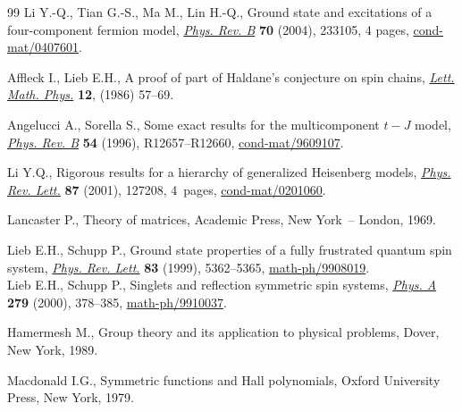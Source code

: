 \documentclass[11pt]{article}
\begin{document}
\begin{thebibliography}{99}
Li Y.-Q., Tian G.-S., Ma M., Lin H.-Q.,
Ground state and excitations of a four-component fermion model,
\href{http://dx.doi.org/10.1103/PhysRevB.70.233105}{{\it Phys. Rev. B}} {\bf 70} (2004), 233105, 4 pages,
\href{http://arxiv.org/abs/cond-mat/0407601}{cond-mat/0407601}.


Af\/f\/leck I., Lieb E.H.,
A proof of part of Haldane's conjecture on spin chains,
\href{http://dx.doi.org/10.1007/BF00400304}{{\it Lett. Math. Phys.}} {\bf 12}, (1986) 57--69.

Angelucci A., Sorella S.,
Some exact results for the multicomponent $t-J$ model,
\href{http://dx.doi.org/10.1103/PhysRevB.54.R12657}{{\it Phys. Rev. B}} {\bf 54}  (1996), R12657--R12660,
\href{http://arxiv.org/abs/cond-mat/9609107}{cond-mat/9609107}.


Li Y.Q.,
Rigorous results for a hierarchy of generalized Heisenberg models,
\href{http://dx.doi.org/10.1103/PhysRevLett.87.127208}{{\it Phys. Rev. Lett.}} {\bf 87} (2001), 127208, 4~pages,
\href{http://arxiv.org/abs/cond-mat/0201060}{cond-mat/0201060}.

Lancaster P.,
Theory of matrices, Academic Press, New York~-- London, 1969.

Lieb E.H., Schupp P.,
Ground state properties of a fully frustrated quantum spin system,
\href{http://dx.doi.org/10.1103/PhysRevLett.83.5362}{{\it Phys. Rev. Lett.}} {\bf 83} (1999), 5362--5365,
\href{http://arxiv.org/abs/math-ph/9908019}{math-ph/9908019}.
\\
Lieb E.H., Schupp P.,
Singlets and ref\/lection symmetric spin systems,
\href{http://dx.doi.org/10.1016/S0378-4371(99)00521-X}{{\it Phys. A}} {\bf 279} (2000),  378--385,
\mbox{\href{http://arxiv.org/abs/math-ph/9910037}{math-ph/9910037}}.


Hamermesh M.,
Group theory and its application to physical problems,
Dover, New York, 1989.

Macdonald I.G.,
Symmetric functions and Hall polynomials, Oxford University Press, New York, 1979.


\end{thebibliography}
\end{document}
